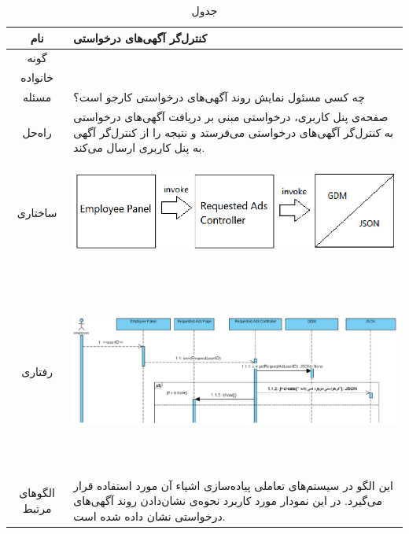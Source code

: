 \begin{table}[H]
	\begin{adjustbox}{width=\textwidth}
		\begin{tabular}{|c|p{\textwidth}|}
			\hline
			نام &
			کنترل‌گر آگهی‌های درخواستی \\ 
			\hline
			گونه & 
			\grasp \\
			\hline
			خانواده &
			\controller \\
			\hline
			مسئله & 
			چه کسی مسئول نمایش روند آگهی‌های درخواستی کارجو است؟\\
			\hline
			راه‌حل& 
			صفحه‌ی پنل ‌کاربری، درخواستی مبنی بر دریافت آگهی‌های درخواستی به کنترل‌گر آگهی‌های درخواستی می‌فرستد و نتیجه را از کنترل‌گر آگهی به پنل کاربری ارسال می‌کند. \\
			\hline
			ساختاری & 
			\begin{minipage}{\textwidth}
				\begin{flushleft}
					\begin{minipage}{\textwidth}
						\includegraphics[width=13cm, height=2.7cm]{./images/7-5-1}
					\end{minipage}
				\end{flushleft}
			\end{minipage}
			
			\\
			\hline
			رفتاری & 
			\begin{minipage}{\textwidth}
				\begin{flushleft}
					\begin{minipage}{\textwidth}
						\includegraphics[width=13.5cm, height=6cm]{./images/7-5-2}
					\end{minipage}
				\end{flushleft}
			\end{minipage}
			\\
			\hline
						الگو‌های مرتبط &
						این الگو در سیستم‌های تعاملی پیاده‌سازی اشیاء آن مورد استفاده قرار می‌گیرد. در این نمودار مورد کاربرد نحوه‌ی نشان‌دادن روند آگهی‌های درخواستی نشان داده شده است.
						 \\
			\hline
		\end{tabular}
	\end{adjustbox}
	\caption{جدول }
	\label{table-with-pic:5}
\end{table}

